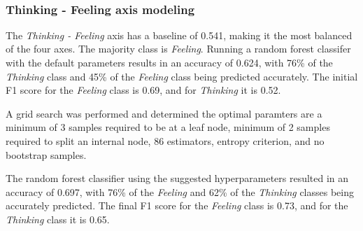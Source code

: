 \documentclass[11pt]{article}
\begin{document}
    \begin{center}
    \end{center}
    { \hspace*{\fill} \\}
    
    \subsubsection{Thinking - Feeling axis
modeling}\label{thinking---feeling-axis-modeling}

    The \emph{Thinking - Feeling} axis has a baseline of 0.541, making it
the most balanced of the four axes. The majority class is
\emph{Feeling}. Running a random forest classifer with the default
parameters results in an accuracy of 0.624, with 76\% of the
\emph{Thinking} class and 45\% of the \emph{Feeling} class being
predicted accurately. The initial F1 score for the \emph{Feeling} class
is 0.69, and for \emph{Thinking} it is 0.52.

A grid search was performed and determined the optimal paramters are a
minimum of 3 samples required to be at a leaf node, minimum of 2 samples
required to split an internal node, 86 estimators, entropy criterion,
and no bootstrap samples.

The random forest classifier using the suggested hyperparameters
resulted in an accuracy of 0.697, with 76\% of the \emph{Feeling} and
62\% of the \emph{Thinking} classes being accurately predicted. The
final F1 score for the \emph{Feeling} class is 0.73, and for the
\emph{Thinking} class it is 0.65.
\end{document}
